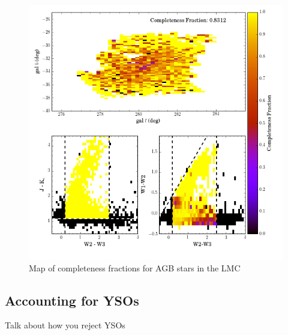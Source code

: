 \begin{figure}[h]
\includegraphics[width=6in]{figs/ogle_completeness_map.png}
\caption{Map of completeness fractions for AGB stars in the LMC \label{fig:lmc_completeness}}
\end{figure}

\subsection{Accounting for YSOs}
{\color{red}Talk about how you reject YSOs}


